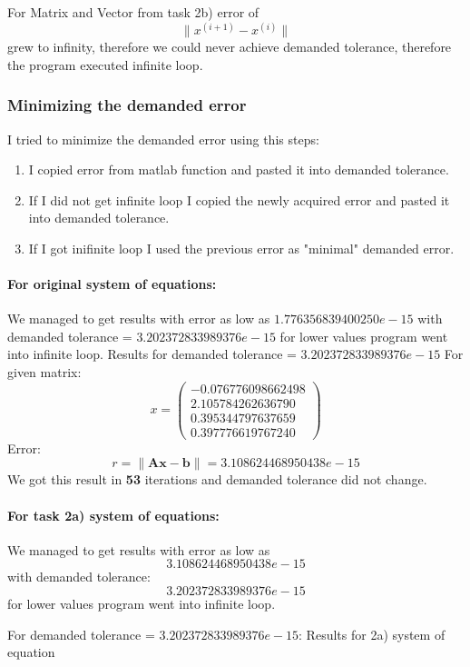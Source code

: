 For Matrix and Vector from task 2b) error of
\[ \| x^{(i+1)} - x^{(i)} \| \]
grew to infinity, therefore we could never achieve demanded tolerance, therefore the program executed infinite loop.

\subsubsection{Minimizing the demanded error}
I tried to minimize the demanded error using this steps:
\begin{enumerate}
\item I copied error from matlab function and pasted it into demanded tolerance.
\item If I did not get infinite loop I copied the newly acquired error and pasted it into demanded tolerance.
\item If I got inifinite loop I used the previous error as "minimal" demanded error.
\end{enumerate}
\newpage
\paragraph{For original system of equations:}
We managed to get results with error as low as $1.776356839400250e-15$ with demanded tolerance = $3.202372833989376e-15$ for lower values program went into infinite loop.
Results for demanded tolerance = $3.202372833989376e-15$
For given matrix:
\[ x = \left( \begin{array}{cc}
  -0.076776098662498 \\
   2.105784262636790 \\
   0.395344797637659 \\
   0.397776619767240
\end{array} \right)
\]
Error:
\[ r = \| \mathbf{A}\mathbf{x} - \mathbf{b}\| = 3.108624468950438e-15 \]
We got this result in \textbf{53} iterations and demanded tolerance did not change.

\newpage
\paragraph{For task 2a) system of equations:}
We managed to get results with error as low as
\[ 3.108624468950438e-15 \] with demanded tolerance:
\[ 3.202372833989376e-15 \]
for lower values program went into infinite loop.

For demanded tolerance = $3.202372833989376e-15$:
Results for 2a) system of equation

